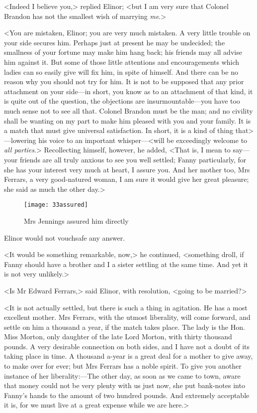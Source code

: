 <Indeed I believe you,> replied Elinor; <but I am very sure that Colonel Brandon has not the smallest wish of marrying \textit{me}.>

<You are mistaken, Elinor; you are very much mistaken. A very little trouble on your side secures him. Perhaps just at present he may be undecided; the smallness of your fortune may make him hang back; his friends may all advise him against it. But some of those little attentions and encouragements which ladies can so easily give will fix him, in spite of himself. And there can be no reason why you should not try for him. It is not to be supposed that any prior attachment on your side—in short, you know as to an attachment of that kind, it is quite out of the question, the objections are insurmountable—you have too much sense not to see all that. Colonel Brandon must be the man; and no civility shall be wanting on my part to make him pleased with you and your family. It is a match that must give universal satisfaction. In short, it is a kind of thing that>—lowering his voice to an important whisper—<will be exceedingly welcome to \textit{all parties}.> Recollecting himself, however, he added, <That is, I mean to say—your friends are all truly anxious to see you well settled; Fanny particularly, for she has your interest very much at heart, I assure you. And her mother too, Mrs Ferrars, a very good-natured woman, I am sure it would give her great pleasure; she said as much the other day.>

\begin{figure}[tbph]
\centering
\texttt{[image: 33assured]}
\caption{Mrs Jennings assured him directly}
\end{figure}

Elinor would not vouchsafe any answer.

<It would be something remarkable, now,> he continued, <something droll, if Fanny should have a brother and I a sister settling at the same time. And yet it is not very unlikely.>

<Is Mr Edward Ferrars,> said Elinor, with resolution, <going to be married?>

<It is not actually settled, but there is such a thing in agitation. He has a most excellent mother. Mrs Ferrars, with the utmost liberality, will come forward, and settle on him a thousand a year, if the match takes place. The lady is the Hon. Miss Morton, only daughter of the late Lord Morton, with thirty thousand pounds. A very desirable connection on both sides, and I have not a doubt of its taking place in time. A thousand a-year is a great deal for a mother to give away, to make over for ever; but Mrs Ferrars has a noble spirit. To give you another instance of her liberality:—The other day, as soon as we came to town, aware that money could not be very plenty with us just now, she put bank-notes into Fanny's hands to the amount of two hundred pounds. And extremely acceptable it is, for we must live at a great expense while we are here.>

